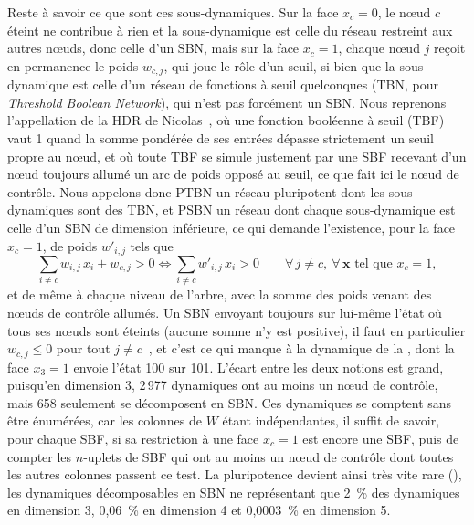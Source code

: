 Reste à savoir ce que sont ces sous-dynamiques.
Sur la face $x_c = 0$, le nœud $c$ éteint ne contribue à rien et la sous-dynamique est celle du réseau restreint aux autres nœuds, donc celle d'un SBN, mais sur la face $x_c = 1$, chaque nœud $j$ reçoit en permanence le poids $w_{c,j}$, qui joue le rôle d'un seuil, si bien que la sous-dynamique est celle d'un réseau de fonctions à seuil quelconques (TBN, pour \emph{Threshold Boolean Network}), qui n'est pas forcément un SBN.
Nous reprenons l'appellation de la HDR de Nicolas~\cite{glade2022}, où une fonction booléenne à seuil (TBF) vaut 1 quand la somme pondérée de ses entrées dépasse strictement un seuil propre au nœud, et où toute TBF se simule justement par une SBF recevant d'un nœud toujours allumé un arc de poids opposé au seuil, ce que fait ici le nœud de contrôle.
Nous appelons donc PTBN un réseau pluripotent dont les sous-dynamiques sont des TBN, et PSBN un réseau dont chaque sous-dynamique est celle d'un SBN de dimension inférieure, ce qui demande l'existence, pour la face $x_c = 1$, de poids $w'_{i,j}$ tels que
\begin{equation}
\sum_{i \neq c} w_{i,j}\, x_i + w_{c,j} > 0
\iff
\sum_{i \neq c} w'_{i,j}\, x_i > 0
\qquad \forall\, j \neq c,\ \forall\, \mathbf{x} \text{ tel que } x_c = 1 ,
\end{equation}
et de même à chaque niveau de l'arbre, avec la somme des poids venant des nœuds de contrôle allumés.
Un SBN envoyant toujours sur lui-même l'état où tous ses nœuds sont éteints (aucune somme n'y est positive), il faut en particulier $w_{c,j} \le 0$ pour tout $j \neq c$~\cite{wu2024}, et c'est ce qui manque à la dynamique de la , dont la face $x_3 = 1$ envoie l'état 100 sur 101.
L'écart entre les deux notions est grand, puisqu'en dimension 3, 2\,977 dynamiques ont au moins un nœud de contrôle, mais 658 seulement se décomposent en SBN.
Ces dynamiques se comptent sans être énumérées, car les colonnes de $W$ étant indépendantes, il suffit de savoir, pour chaque SBF, si sa restriction à une face $x_c = 1$ est encore une SBF, puis de compter les $n$-uplets de SBF qui ont au moins un nœud de contrôle dont toutes les autres colonnes passent ce test.
La pluripotence devient ainsi très vite rare (), les dynamiques décomposables en SBN ne représentant que 2~\% des dynamiques en dimension 3, 0,06~\% en dimension 4 et 0,0003~\% en dimension 5.

